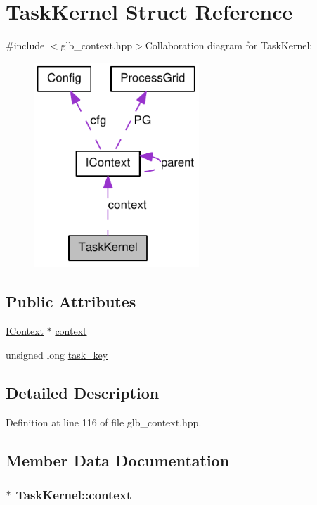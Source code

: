 \hypertarget{struct_task_kernel}{
\section{TaskKernel Struct Reference}
\label{struct_task_kernel}
}


{\ttfamily \#include $<$glb\_\-context.hpp$>$}Collaboration diagram for TaskKernel:\nopagebreak
\begin{figure}[H]
\begin{center}
\leavevmode
\includegraphics[width=176pt]{struct_task_kernel__coll__graph}
\end{center}
\end{figure}
\subsection*{Public Attributes}
\begin{DoxyCompactItemize}
\item 
\hyperlink{class_i_context}{IContext} $\ast$ \hyperlink{struct_task_kernel_a41383630d11c2e03c5d5a5298f1122e2}{context}
\item 
unsigned long \hyperlink{struct_task_kernel_aa63b721f0f2c7d44a178fb87b532c0a0}{task\_\-key}
\end{DoxyCompactItemize}


\subsection{Detailed Description}


Definition at line 116 of file glb\_\-context.hpp.

\subsection{Member Data Documentation}
\hypertarget{struct_task_kernel_a41383630d11c2e03c5d5a5298f1122e2}{
\subsubsection[{context}]{$\ast$ {\bf TaskKernel::context}}}
\label{struct_task_kernel_a41383630d11c2e03c5d5a5298f1122e2}


